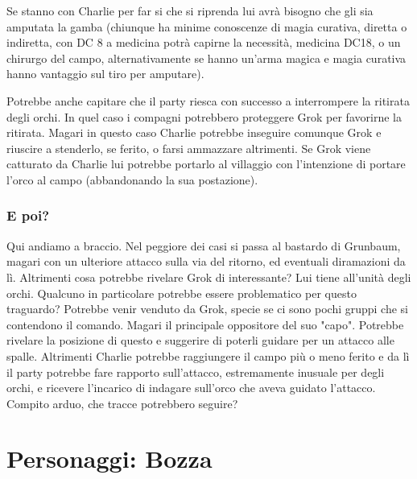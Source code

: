 \documentclass[10pt,twoside, twocolumn, openany]{dndbook}
\begin{document}
Se stanno con Charlie per far si che si riprenda lui avrà bisogno che gli sia amputata la gamba (chiunque ha minime conoscenze di magia curativa, diretta o indiretta, con DC 8 a medicina potrà capirne la necessità,
medicina DC18, o un chirurgo del campo, alternativamente se hanno un'arma magica e magia curativa hanno vantaggio sul tiro per amputare).

Potrebbe anche capitare che il party riesca con successo a interrompere la ritirata degli orchi. In quel caso i compagni potrebbero proteggere Grok per favorirne la ritirata. 
Magari in questo caso Charlie potrebbe inseguire comunque Grok e riuscire a stenderlo, se ferito, o farsi ammazzare altrimenti. 
Se Grok viene catturato da Charlie lui potrebbe portarlo al villaggio con l'intenzione di portare l'orco al campo (abbandonando la sua postazione).

\subsubsection{E poi?}
Qui andiamo a braccio. Nel peggiore dei casi si passa al bastardo di Grunbaum, magari con un ulteriore attacco sulla via del ritorno, ed eventuali diramazioni da lì.
Altrimenti cosa potrebbe rivelare Grok di interessante? Lui tiene all'unità degli orchi. Qualcuno in particolare potrebbe essere problematico per questo traguardo? Potrebbe venir venduto da Grok, specie se ci sono pochi gruppi che si contendono il comando. Magari il principale oppositore del suo "capo". 
Potrebbe rivelare la posizione di questo e suggerire di poterli guidare per un attacco alle spalle.
Altrimenti Charlie potrebbe raggiungere il campo più o meno ferito e da lì il party potrebbe fare rapporto sull'attacco, estremamente inusuale per degli orchi, e ricevere l'incarico di indagare sull'orco che aveva guidato l'attacco. Compito arduo, che tracce potrebbero seguire?
\clearpage

\section{Personaggi: Bozza}
\end{document}
